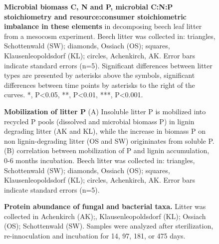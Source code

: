 \documentclass[10pt]{article}
\begin{document}
\begin{flushleft}
\begin{figure}[!h]
\begin{center}
\end{center}
\caption{
{\bf Microbial biomass C, N and P, microbial C:N:P stoichiometry and resource:consumer stoichiometric imbalance in these elements} in decomposing beech leaf litter from a mesocosm experiment. Beech litter was collected in: triangles, Schottenwald (SW); diamonds, Ossiach (OS); squares, Klausenleopoldsdorf (KL); circles, Achenkirch, AK. Error bars indicate standard errors (n=5). Significant differences between litter types are presented by asterisks above the symbols, significant differences between time points by asterisks to the right of the curves. *, P\textless 0.05, **, P\textless 0.01, ***, P\textless 0.001.}
\label{fig:mb}
\end{figure}

\begin{figure}[!h]
\begin{center}
\end{center}
\caption{
{\bf Mobilization of litter P} (A) Insoluble litter P is mobilized into recycled P pools (dissolved and microbial biomass P) in lignin degrading litter (AK and KL), while the increase in biomass P on non lignin-degrading litter (OS and SW) origininates from soluble P. (B) correlation between mobilization of P and lignin accumulation, 0-6 months incubation. Beech litter was collected in: triangles, Schottenwald (SW); diamonds, Ossiach (OS); squares, Klausenleopoldsdorf (KL); circles, Achenkirch, AK. Error bars indicate standard errors (n=5).}
\label{fig:phos}
\end{figure}


\begin{figure}[h!]
\vspace*{2mm}
\begin{center}
\end{center}
\caption{
{\bf Protein abundance of fungal and bacterial taxa.} Litter was collected in Achenkirch (AK);, Klausenleopoldsdorf (KL); Ossiach (OS); Schottenwald (SW). Samples were analyzed after sterilization, re-innoculation and incubation for 14, 97, 181, or 475 days.}
\label{fig:metaprot_barplot}
\end{figure}



\end{flushleft}
\end{document}
